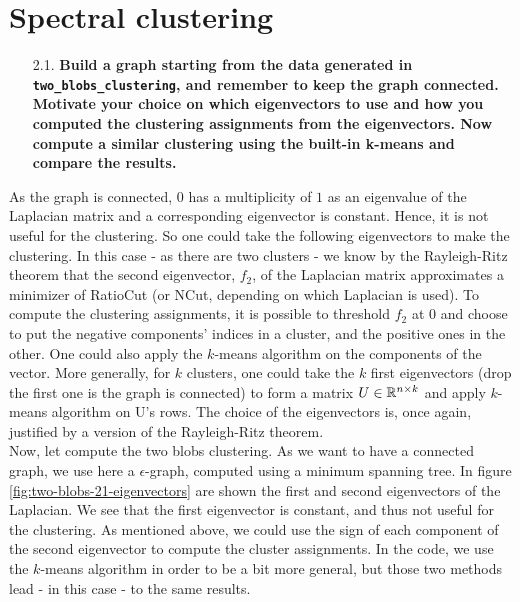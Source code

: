 \documentclass[a4paper, 11pt]{report}
\begin{document}
\chapter{Spectral clustering}



\begin{itemize}
    \item[2.1.] \textbf{Build a graph starting from the data generated in \texttt{two\_blobs\_clustering}, and remember to keep the graph connected. Motivate your choice on which eigenvectors to use and how you computed the clustering assignments from the eigenvectors. Now compute a similar clustering using the built-in k-means and compare the results.}
\end{itemize}
    
    As the graph is connected, $0$ has a multiplicity of $1$ as an eigenvalue of the Laplacian matrix and a corresponding eigenvector is constant. Hence, it is not useful for the clustering. So one could take the following eigenvectors to make the clustering. In this case - as there are two clusters - we know by the Rayleigh-Ritz theorem that the second eigenvector, $f_{2}$, of the Laplacian matrix approximates a minimizer of RatioCut (or NCut, depending on which Laplacian is used). To compute the clustering assignments, it is possible to threshold $f_{2}$ at $0$ and choose to put the negative components' indices in a cluster, and the positive ones in the other. One could also apply the $k$-means algorithm on the components of the vector. More generally, for $k$ clusters, one could take the $k$ first eigenvectors (drop the first one is the graph is connected) to form a matrix $U \in \mathbb{R}^{n \times k}$ and apply $k$-means algorithm on U's rows. The choice of the eigenvectors is, once again, justified by a version of the Rayleigh-Ritz theorem. \\
    
    Now, let compute the two blobs clustering. As we want to have a connected graph, we use here a $\epsilon$-graph, computed using a minimum spanning tree. In figure \ref{fig:two-blobs-21-eigenvectors} are shown the first and second eigenvectors of the Laplacian. We see that the first eigenvector is constant, and thus not useful for the clustering. As mentioned above, we could use the sign of each component of the second eigenvector to compute the cluster assignments. In the code, we use the $k$-means algorithm in order to be a bit more general, but those two methods lead - in this case - to the same results.
\end{document}
